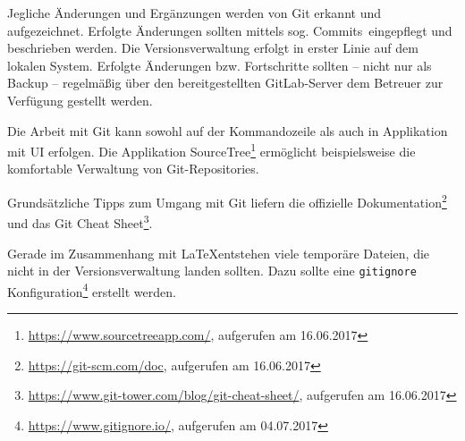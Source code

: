 Jegliche Änderungen und Ergänzungen werden von Git erkannt und aufgezeichnet. Erfolgte Änderungen sollten mittels sog. \glqq Commits\grqq\ eingepflegt und beschrieben werden.
Die Versionsverwaltung erfolgt in erster Linie auf dem lokalen System. Erfolgte Änderungen bzw. Fortschritte sollten -- nicht nur als Backup -- regelmäßig über den
bereitgestellten GitLab-Server dem Betreuer zur Verfügung gestellt werden.

Die Arbeit mit Git kann sowohl auf der Kommandozeile als auch in Applikation mit UI erfolgen. Die Applikation
\glqq SourceTree\grqq\footnote{\url{https://www.sourcetreeapp.com/}, aufgerufen am 16.06.2017} ermöglicht beispielsweise
die komfortable Verwaltung von Git-Repositories.

Grundsätzliche Tipps zum Umgang mit Git liefern die offizielle Dokumentation\footnote{\url{https://git-scm.com/doc}, aufgerufen am 16.06.2017}
und das \glqq Git Cheat Sheet\grqq\footnote{\url{https://www.git-tower.com/blog/git-cheat-sheet/}, aufgerufen am 16.06.2017}.

Gerade im Zusammenhang mit \LaTeX entstehen viele temporäre Dateien, die nicht in der Versionsverwaltung landen sollten.
Dazu sollte eine \texttt{gitignore} Konfiguration\footnote{\url{https://www.gitignore.io/}, aufgerufen am 04.07.2017} erstellt werden.